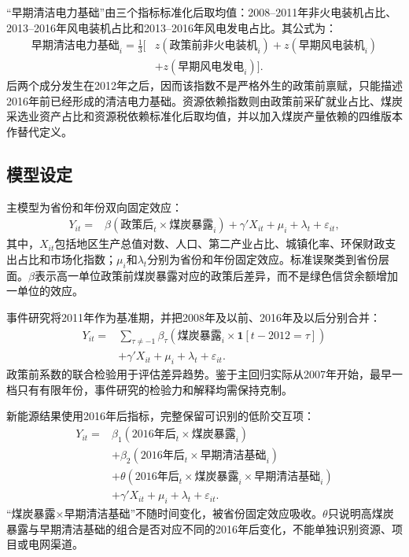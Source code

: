 \documentclass[UTF8,12pt]{ctexart}
\begin{document}
“早期清洁电力基础”由三个指标标准化后取均值：2008--2011年非火电装机占比、2013--2016年风电装机占比和2013--2016年风电发电占比。其公式为：
\begin{equation}
\begin{aligned}
\text{早期清洁电力基础}_{i}
=\frac{1}{3}\big[&z(\text{政策前非火电装机}_{i})
+z(\text{早期风电装机}_{i})\\
&+z(\text{早期风电发电}_{i})\big].
\end{aligned}
\end{equation}
后两个成分发生在2012年之后，因而该指数不是严格外生的政策前禀赋，只能描述2016年前已经形成的清洁电力基础。资源依赖指数则由政策前采矿就业占比、煤炭采选业资产占比和资源税依赖标准化后取均值，并以加入煤炭产量依赖的四维版本作替代定义。

\subsection{模型设定}

主模型为省份和年份双向固定效应：
\begin{equation}
\begin{aligned}
Y_{it}={}&\beta(\text{政策后}_{t}\times\text{煤炭暴露}_{i})
+\gamma'X_{it}+\mu_i+\lambda_t+\varepsilon_{it},
\end{aligned}
\label{eq:did}
\end{equation}
其中，$X_{it}$包括地区生产总值对数、人口、第二产业占比、城镇化率、环保财政支出占比和市场化指数；$\mu_i$和$\lambda_t$分别为省份和年份固定效应。标准误聚类到省份层面。$\beta$表示高一单位政策前煤炭暴露对应的政策后差异，而不是绿色信贷余额增加一单位的效应。

事件研究将2011年作为基准期，并把2008年及以前、2016年及以后分别合并：
\begin{equation}
\begin{aligned}
Y_{it}={}&\sum_{\tau\neq -1}\beta_{\tau}
\left(\text{煤炭暴露}_{i}\times\mathbf{1}[t-2012=\tau]\right)\\
&+\gamma'X_{it}+\mu_i+\lambda_t+\varepsilon_{it}.
\end{aligned}
\label{eq:event}
\end{equation}
政策前系数的联合检验用于评估差异趋势。鉴于主回归实际从2007年开始，最早一档只有有限年份，事件研究的检验力和解释均需保持克制。

新能源结果使用2016年后指标，完整保留可识别的低阶交互项：
\begin{equation}
\begin{aligned}
Y_{it}={}&\beta_1(\text{2016年后}_{t}\times\text{煤炭暴露}_{i})\\
&+\beta_2(\text{2016年后}_{t}\times\text{早期清洁基础}_{i})\\
&+\theta(\text{2016年后}_{t}\times\text{煤炭暴露}_{i}
\times\text{早期清洁基础}_{i})\\
&+\gamma'X_{it}+\mu_i+\lambda_t+\varepsilon_{it}.
\end{aligned}
\label{eq:ddd}
\end{equation}
“煤炭暴露×早期清洁基础”不随时间变化，被省份固定效应吸收。$\theta$只说明高煤炭暴露与早期清洁基础的组合是否对应不同的2016年后变化，不能单独识别资源、项目或电网渠道。
\end{document}
